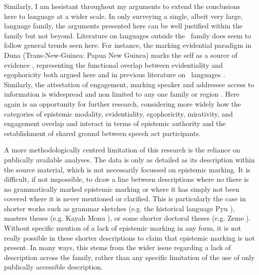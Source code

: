 Similarly, I am hesistant throughout my arguments to extend the conclusions here to language at a wider scale. In only surveying a single, albeit very large, language family, the arguments presented here can be well justified within the family but not beyond. Literature on languages outside the \lfam\ family does seem to follow general trends seen here. For instance, the marking evidential paradigm in Duna (Trans-New-Guinea: Papua New Guinea) marks the self as a source of evidence \cite{SanRoque2012}, representing the functional overlap between evidentiality and egophoricity both argued here and in previous literature on \lfam\ languages \cites{Gawne2017}{Hill2020}. Similarly, the attestation of engagement, marking speaker and addressee access to information is widespread and non limited to any one family or region \cite{EvansBergqvistSanRoque2018a}. Here again is an opportunity for further research, considering more widely how the categories of epistemic modality, evidentiality, egophoricity, mirativity, and engagement overlap and interact in terms of epistemic authority and the establishment of shared ground between speech act participants.

A more methodologically centred limitation of this research is the reliance on publically available analyses. The data is only as detailed as its description within the source material, which is not necessarily focussed on epistemic marking. It is difficult, if not impossible, to draw a line between descriptions where no there is no grammatically marked epistemic marking or where it has simply not been covered where it is never mentioned or clarified. This is particularly the case in shorter works such as grammar sketches (e.g. the historical language Pyu \cite[Subfamily Unclear: Myanmar][]{Miyake2019}), masters theses (e.g. Kayah Monu \cite[Karenic: Myanmar][]{Aung2013}), or some shorter doctoral theses (e.g. Zeme \cite[Zeme subfamily: India][]{Chanu2017}). Without specific mention of a lack of epistemic marking in any form, it is not really possible in these shorter descriptions to claim that epistemic marking is not present. In many ways, this stems from the wider issue regarding a lack of description across the family, rather than any specific limitation of the use of only publically accessible description.

